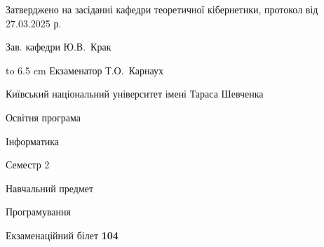 \documentclass[12pt, ukrainian]{article}
\begin{document}
{\smallskip\smallskip \begin {scriptsize} Затверджено на засіданні кафедри теоретичної кібернетики, протокол   від   27.03.2025 р.\par\smallskip\smallskip\smallskip\smallskip
{\parbox {6.5 cm} {Зав. кафедри \dotfill Ю.В.~Крак}}\hspace {0.7cm} {\hbox to 6.5 cm { Екзаменатор \dotfill Т.О.~Карнаух}} \end{scriptsize}}
\newpage
{{\begin {scriptsize}\par
{ \center  Київський національний університет імені Тараса Шевченка \par}
{\parbox {5 cm}{Освітня програма \hfill}{\parbox {7 cm}{Інформатика\hfill}}\parbox {6 cm}{\hfill Семестр 2}}\par
{\parbox {5 cm} {Навчальний предмет \hfill}\parbox {7 cm}{Програмування \hfill}\parbox {6cm}{\hfill}\par}\vspace{-15pt} \end{scriptsize}}{\center Екзаменаційний білет \No \textbf { 104 }\par}}
\end{document}
